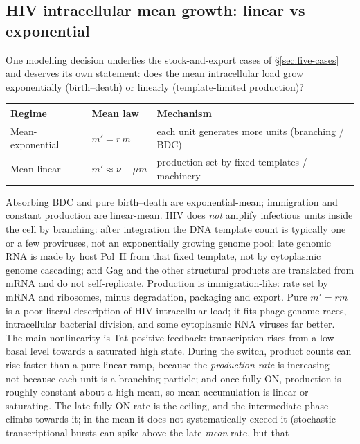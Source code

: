 \subsection{HIV intracellular mean growth: linear vs exponential}
\label{sec:hiv-growth}

One modelling decision underlies the stock-and-export cases of
\S\ref{sec:five-cases} and deserves its own statement: does the mean
intracellular load grow exponentially (birth--death) or linearly
(template-limited production)?

\begin{center}
\renewcommand{\arraystretch}{1.2}
\small
\begin{tabular}{@{}lll@{}}
\toprule
Regime & Mean law & Mechanism \\
\midrule
Mean-exponential & $m'=r\,m$ & each unit generates more units (branching / BDC) \\
Mean-linear & $m'\approx\nu-\mu m$ & production set by fixed templates / machinery \\
\bottomrule
\end{tabular}
\end{center}
Absorbing BDC and pure birth--death are exponential-mean; immigration and
constant production are linear-mean. HIV does \emph{not} amplify infectious
units inside the cell by branching: after integration the DNA template
count is typically one or a few proviruses, not an exponentially growing
genome pool; late genomic RNA is made by host Pol~II from that fixed
template, not by cytoplasmic genome cascading; and Gag and the other
structural products are translated from mRNA and do not self-replicate.
Production is immigration-like: rate set by mRNA and ribosomes, minus
degradation, packaging and export. Pure $m'=rm$ is a poor literal
description of HIV intracellular load; it fits phage genome races,
intracellular bacterial division, and some cytoplasmic RNA viruses far
better. The main nonlinearity is Tat positive feedback: transcription rises
from a low basal level towards a saturated high state. During the switch,
product counts can rise faster than a pure linear ramp, because the
\emph{production rate} is increasing --- not because each unit is a
branching particle; and once fully ON, production is roughly constant about
a high mean, so mean accumulation is linear or saturating. The late
fully-ON rate is the ceiling, and the intermediate phase climbs towards it;
in the mean it does not systematically exceed it (stochastic
transcriptional bursts can spike above the late \emph{mean} rate, but that
